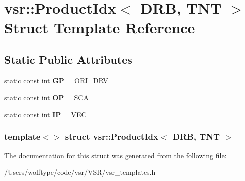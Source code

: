 \hypertarget{structvsr_1_1_product_idx_3_01_d_r_b_00_01_t_n_t_01_4}{\section{vsr\-:\-:Product\-Idx$<$ D\-R\-B, T\-N\-T $>$ Struct Template Reference}
\label{structvsr_1_1_product_idx_3_01_d_r_b_00_01_t_n_t_01_4}
}
\subsection*{Static Public Attributes}
\begin{DoxyCompactItemize}
\item 
\hypertarget{structvsr_1_1_product_idx_3_01_d_r_b_00_01_t_n_t_01_4_a167d92c02a90194e12af47bd579d4503}{static const int {\bfseries G\-P} = O\-R\-I\-\_\-\-D\-R\-V}\label{structvsr_1_1_product_idx_3_01_d_r_b_00_01_t_n_t_01_4_a167d92c02a90194e12af47bd579d4503}

\item 
\hypertarget{structvsr_1_1_product_idx_3_01_d_r_b_00_01_t_n_t_01_4_a7a5869a2bb294210ffb237bc928de6ea}{static const int {\bfseries O\-P} = S\-C\-A}\label{structvsr_1_1_product_idx_3_01_d_r_b_00_01_t_n_t_01_4_a7a5869a2bb294210ffb237bc928de6ea}

\item 
\hypertarget{structvsr_1_1_product_idx_3_01_d_r_b_00_01_t_n_t_01_4_a178bc6e0b780df5086f5a3c08f8e7da5}{static const int {\bfseries I\-P} = V\-E\-C}\label{structvsr_1_1_product_idx_3_01_d_r_b_00_01_t_n_t_01_4_a178bc6e0b780df5086f5a3c08f8e7da5}

\end{DoxyCompactItemize}
\subsubsection*{template$<$$>$ struct vsr\-::\-Product\-Idx$<$ D\-R\-B, T\-N\-T $>$}



The documentation for this struct was generated from the following file\-:\begin{DoxyCompactItemize}
\item 
/\-Users/wolftype/code/vsr/\-V\-S\-R/vsr\-\_\-templates.\-h\end{DoxyCompactItemize}

